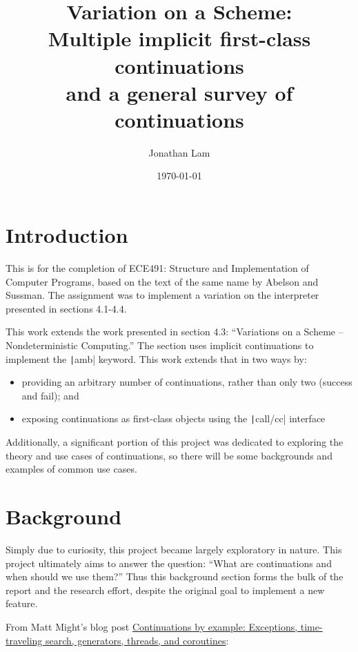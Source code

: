 \documentclass[]{article}
\begin{document}
\title{Variation on a Scheme:\\Multiple implicit first-class continuations\\
  \vspace{6pt}
  \large{} and a general survey of continuations}
\author{Jonathan Lam}
\date{\today{}}

\maketitle{}

\section{Introduction}
\label{sec:intr}

This is for the completion of ECE491: Structure and Implementation of Computer Programs, based on the text of the same name by Abelson and Sussman. The assignment was to implement a variation on the interpreter presented in sections 4.1-4.4.

This work extends the work presented in section 4.3: ``Variations on a Scheme -- Nondeterministic Computing.'' The section uses implicit continuations to implement the \texttt|amb| keyword. This work extends that in two ways by:
\begin{itemize}
\item providing an arbitrary number of continuations, rather than only two (success and fail); and
\item exposing continuations as first-class objects using the \texttt|call/cc| interface
\end{itemize}

Additionally, a significant portion of this project was dedicated to exploring the theory and use cases of continuations, so there will be some backgrounds and examples of common use cases.

\section{Background}
\label{sec:back}

Simply due to curiosity, this project became largely exploratory in nature. This project ultimately aims to answer the question: ``What are continuations and when should we use them?'' Thus this background section forms the bulk of the report and the research effort, despite the original goal to implement a new feature.

From Matt Might's blog post \href{https://matt.might.net/articles/programming-with-continuations--exceptions-backtracking-search-threads-generators-coroutines/}{Continuations by example: Exceptions, time-traveling search, generators, threads, and coroutines}:
\end{document}
